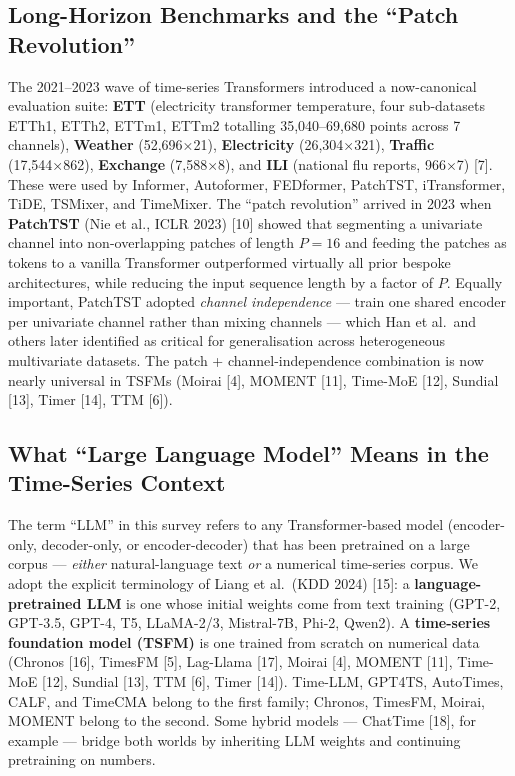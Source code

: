 \subsection{Long-Horizon Benchmarks and the ``Patch Revolution''}\label{long-horizon-benchmarks-and-the-patch-revolution}

The 2021--2023 wave of time-series Transformers introduced a now-canonical evaluation suite: \textbf{ETT} (electricity transformer temperature, four sub-datasets ETTh1, ETTh2, ETTm1, ETTm2 totalling 35,040--69,680 points across 7 channels), \textbf{Weather} (52,696×21), \textbf{Electricity} (26,304×321), \textbf{Traffic} (17,544×862), \textbf{Exchange} (7,588×8), and \textbf{ILI} (national flu reports, 966×7) {[}7{]}. These were used by Informer, Autoformer, FEDformer, PatchTST, iTransformer, TiDE, TSMixer, and TimeMixer. The ``patch revolution'' arrived in 2023 when \textbf{PatchTST} (Nie et al., ICLR 2023) {[}10{]} showed that segmenting a univariate channel into non-overlapping patches of length \(P=16\) and feeding the patches as tokens to a vanilla Transformer outperformed virtually all prior bespoke architectures, while reducing the input sequence length by a factor of \(P\). Equally important, PatchTST adopted \emph{channel independence} --- train one shared encoder per univariate channel rather than mixing channels --- which Han et al.~and others later identified as critical for generalisation across heterogeneous multivariate datasets. The patch + channel-independence combination is now nearly universal in TSFMs (Moirai {[}4{]}, MOMENT {[}11{]}, Time-MoE {[}12{]}, Sundial {[}13{]}, Timer {[}14{]}, TTM {[}6{]}).

\subsection{What ``Large Language Model'' Means in the Time-Series Context}\label{what-large-language-model-means-in-the-time-series-context}

The term ``LLM'' in this survey refers to any Transformer-based model (encoder-only, decoder-only, or encoder-decoder) that has been pretrained on a large corpus --- \emph{either} natural-language text \emph{or} a numerical time-series corpus. We adopt the explicit terminology of Liang et al.~(KDD 2024) {[}15{]}: a \textbf{language-pretrained LLM} is one whose initial weights come from text training (GPT-2, GPT-3.5, GPT-4, T5, LLaMA-2/3, Mistral-7B, Phi-2, Qwen2). A \textbf{time-series foundation model (TSFM)} is one trained from scratch on numerical data (Chronos {[}16{]}, TimesFM {[}5{]}, Lag-Llama {[}17{]}, Moirai {[}4{]}, MOMENT {[}11{]}, Time-MoE {[}12{]}, Sundial {[}13{]}, TTM {[}6{]}, Timer {[}14{]}). Time-LLM, GPT4TS, AutoTimes, CALF, and TimeCMA belong to the first family; Chronos, TimesFM, Moirai, MOMENT belong to the second. Some hybrid models --- ChatTime {[}18{]}, for example --- bridge both worlds by inheriting LLM weights and continuing pretraining on numbers.

